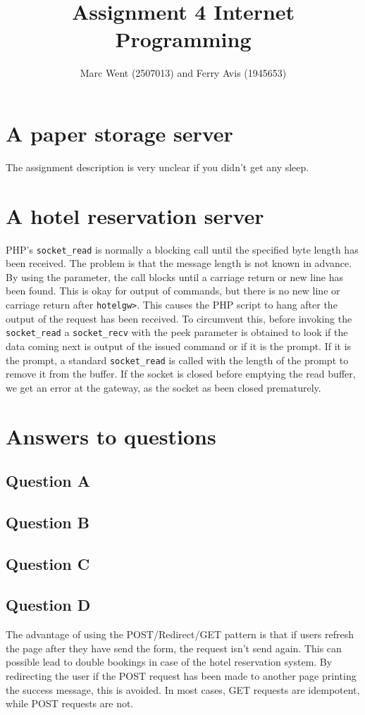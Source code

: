 \documentclass[11pt]{article}
\title{Assignment 4 Internet Programming}
\author{Marc Went (2507013) and Ferry Avis (1945653)}
\begin{document}
\maketitle
\section{A paper storage server}

The assignment description is very unclear if you didn't get any sleep.

\section{A hotel reservation server}

PHP's \texttt{socket_read} is normally a blocking call until the specified byte length has been received. The problem is that the message length is not known in advance. By using the  parameter, the call blocks until a carriage return or new line has been found. This is okay for output of commands, but there is no new line or carriage return after \texttt{hotelgw>}. This causes the PHP script to hang after the output of the request has been received. To circumvent this, before invoking the \texttt{socket_read} a \texttt{socket_recv} with the peek parameter is obtained to look if the data coming next is output of the issued command or if it is the prompt. If it is the prompt, a standard \texttt{socket_read} is called with the length of the prompt to remove it from the buffer. If the socket is closed before emptying the read buffer, we get an error at the gateway, as the socket as been closed prematurely.

\section{Answers to questions}

\subsection{Question A}

\subsection{Question B}

\subsection{Question C}

\subsection{Question D}

The advantage of using the POST/Redirect/GET pattern is that if users refresh the page after they have send the form, the request isn't send again. This can possible lead to double bookings in case of the hotel reservation system. By redirecting the user if the POST request has been made to another page printing the success message, this is avoided. In most cases, GET requests are idempotent, while POST requests are not.
\end{document}
